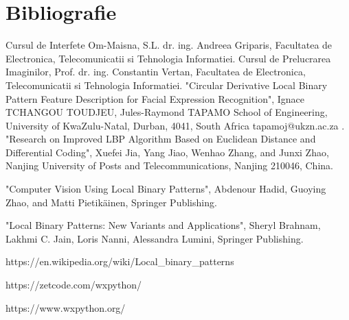 \section{Bibliografie}

\begin{thebibliography}{100} %
	 Cursul de Interfete Om-Maisna, S.L. dr. ing. Andreea Griparis, Facultatea de Electronica, Telecomunicatii si Tehnologia Informatiei.
	 Cursul de Prelucrarea Imaginilor, Prof. dr. ing. Constantin Vertan, Facultatea de Electronica, Telecomunicatii si Tehnologia Informatiei.
	 "Circular Derivative Local Binary Pattern
	Feature Description for Facial Expression
	Recognition", Ignace TCHANGOU TOUDJEU, Jules-Raymond TAPAMO
	School of Engineering, University of KwaZulu-Natal, Durban, 4041, South Africa
	tapamoj@ukzn.ac.za .
	 "Research on Improved LBP Algorithm Based on Euclidean Distance and
	Differential Coding", Xuefei Jia, Yang Jiao, Wenhao Zhang, and Junxi Zhao, Nanjing University of Posts and Telecommunications, Nanjing 210046, China.
	
	 "Computer Vision Using Local Binary Patterns", Abdenour Hadid, Guoying Zhao, and Matti Pietikäinen, Springer Publishing.
	
	 "Local Binary Patterns: New Variants and Applications", Sheryl Brahnam,  Lakhmi C. Jain, Loris Nanni,  Alessandra Lumini, Springer Publishing.
	
	 https://en.wikipedia.org/wiki/Local\_binary\_patterns
	
	 https://zetcode.com/wxpython/
	
	 https://www.wxpython.org/
\end{thebibliography}